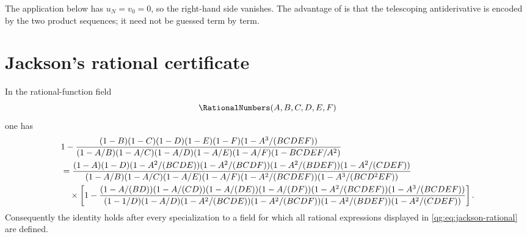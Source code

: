 The application below has $u_N=v_0=0$, so the right-hand side vanishes.  The
advantage of  is that the telescoping
antiderivative is encoded by the two product sequences; it need not be guessed
term by term.

\section{Jackson's rational certificate}
\label{qg:sec:jackson-certificate}

\begin{lemma}
\label{qg:lem-jackson-rational-certificate}
In the rational-function field
\[
 \RationalNumbers(A,B,C,D,E,F)
\]
one has
\begingroup
\scriptsize
\begin{align}
&1-
 \frac{(1-B)(1-C)(1-D)(1-E)(1-F)(1-A^3/(BCDEF))}
 {(1-A/B)(1-A/C)(1-A/D)(1-A/E)(1-A/F)(1-BCDEF/A^2)}
 \notag\\
&=\frac{(1-A)(1-D)(1-A^2/(BCDE))(1-A^2/(BCDF))
 (1-A^2/(BDEF))(1-A^2/(CDEF))}
 {(1-A/B)(1-A/C)(1-A/E)(1-A/F)
 (1-A^2/(BCDEF))(1-A^3/(BCD^2EF))}
 \notag\\
&\quad\times\left[
 1-
 \frac{(1-A/(BD))(1-A/(CD))(1-A/(DE))(1-A/(DF))
 (1-A^2/(BCDEF))(1-A^3/(BCDEF))}
 {(1-1/D)(1-A/D)(1-A^2/(BCDE))(1-A^2/(BCDF))
 (1-A^2/(BDEF))(1-A^2/(CDEF))}
 \right].
\label{qg:eq:jackson-rational}
\end{align}
\endgroup
Consequently the identity holds after every specialization to a field for
which all rational expressions displayed in
\eqref{qg:eq:jackson-rational} are defined.
\end{lemma}

